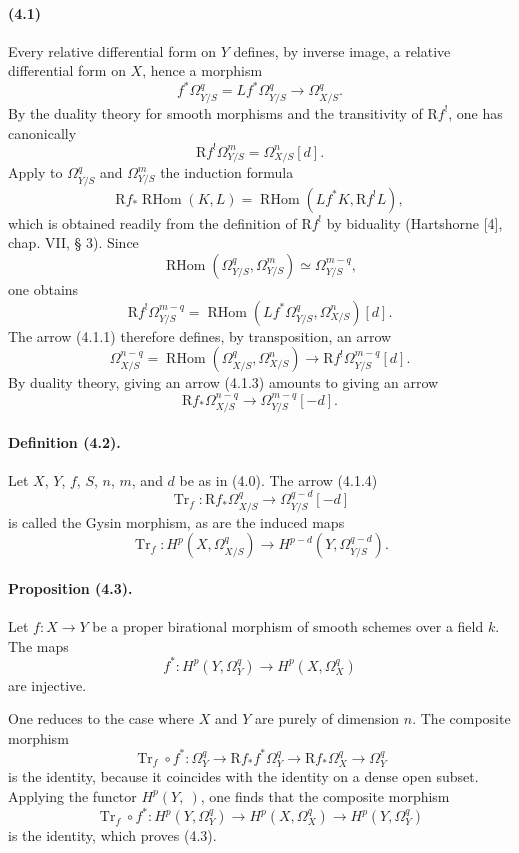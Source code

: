 \documentclass[10pt]{article}
\newcommand{\R}{\mathrm R}
\providecommand{\Tr}{\operatorname{Tr}}
\providecommand{\RHom}{\operatorname{RHom}}
\begin{document}
\paragraph{(4.1)} Every relative differential form on $Y$ defines, by inverse image, a relative differential form on $X$, hence a morphism
\[
\tag{4.1.1}
f^*\Omega_{Y/S}^q=Lf^*\Omega_{Y/S}^q\longrightarrow\Omega_{X/S}^q.
\]
By the duality theory for smooth morphisms and the transitivity of $\R f^!$, one has canonically
\[
\tag{4.1.2}
\R f^!\Omega_{Y/S}^m=\Omega_{X/S}^n[d].
\]
Apply to $\Omega_{Y/S}^q$ and $\Omega_{Y/S}^m$ the induction formula
\[
\R f_*\RHom(K,L)=\RHom(Lf^*K,\R f^!L),
\]
which is obtained readily from the definition of $\R f^!$ by biduality (Hartshorne [4], chap. VII, § 3). Since
\[
\RHom(\Omega_{Y/S}^q,\Omega_{Y/S}^m)\simeq\Omega_{Y/S}^{m-q},
\]
one obtains
\[
\R f^!\Omega_{Y/S}^{m-q}=\RHom(Lf^*\Omega_{Y/S}^q,\Omega_{X/S}^n)[d].
\]
The arrow (4.1.1) therefore defines, by transposition, an arrow
\[
\tag{4.1.3}
\Omega_{X/S}^{n-q}=\RHom(\Omega_{X/S}^q,\Omega_{X/S}^n)
\longrightarrow \R f^!\Omega_{Y/S}^{m-q}[d].
\]
By duality theory, giving an arrow (4.1.3) amounts to giving an arrow
\[
\tag{4.1.4}
\R f_*\Omega_{X/S}^{n-q}\longrightarrow\Omega_{Y/S}^{m-q}[-d].
\]

\paragraph{Definition (4.2).} Let $X$, $Y$, $f$, $S$, $n$, $m$, and $d$ be as in (4.0). The arrow (4.1.4)
\[
\Tr_f:\R f_*\Omega_{X/S}^q\longrightarrow\Omega_{Y/S}^{q-d}[-d]
\]
is called the Gysin morphism, as are the induced maps
\[
\Tr_f:H^p(X,\Omega_{X/S}^q)\longrightarrow H^{p-d}(Y,\Omega_{Y/S}^{q-d}).
\]

\paragraph{Proposition (4.3).} Let $f:X\to Y$ be a proper birational morphism of smooth schemes over a field $k$. The maps
\[
f^*:H^p(Y,\Omega_Y^q)\longrightarrow H^p(X,\Omega_X^q)
\]
are injective.

One reduces to the case where $X$ and $Y$ are purely of dimension $n$. The composite morphism
\[
\Tr_f\circ f^*:\Omega_Y^q\longrightarrow\R f_*f^*\Omega_Y^q\longrightarrow\R f_*\Omega_X^q\longrightarrow\Omega_Y^q
\]
is the identity, because it coincides with the identity on a dense open subset. Applying the functor $H^p(Y,\ )$, one finds that the composite morphism
\[
\Tr_f\circ f^*:H^p(Y,\Omega_Y^q)\longrightarrow H^p(X,\Omega_X^q)\longrightarrow H^p(Y,\Omega_Y^q)
\]
is the identity, which proves (4.3).
\end{document}
